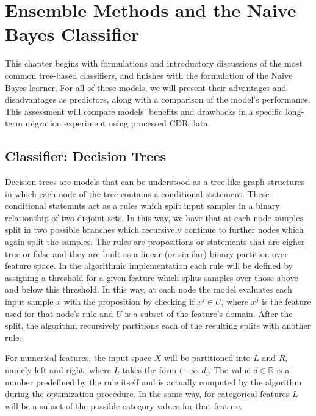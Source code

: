 \chapter{Ensemble Methods and the Naive Bayes Classifier}\label{ch:ensembleMethods}

This chapter begins with formulations and introductory discussions of the most common tree-based classifiers, and finishes with the formulation of the Naive Bayes learner.
For all of these models, we will present their advantages and disadvantages as predictors, along with a comparison of the model's performance.
This assessment will compare models' benefits and drawbacks in a specific long-term migration experiment using processed CDR data.

\section{Classifier: Decision Trees}\label{section:decision_trees}


Decision trees are models that can be understood as a tree-like graph structures in which each node of the tree contains a conditional statement.
These conditional statemnts act as a rules which split input samples in a binary relationship of two disjoint sets.
In this way, we have that at each node samples split in two possible branches which recursively continue to further nodes which again split the samples.
The rules are propositions or statements that are eigher true or false and they are built as a linear (or similar) binary partition over feature space.
In the algorithmic implementation each rule will be defined by assigning a threshold for a given feature which splits samples over those above and below this threshold.
In this way, at each node the model evaluates each input sample $x$ with the proposition by checking if $x^j \in U$, where $x^j$ is the feature used for that node's rule and $U$ is a subset of the feature's domain.
After the split, the algorithm recursively partitions each of the resulting splits with another rule.


For numerical features, the input space $X$ will be partitioned into $L$ and $R$, namely left and right, where $L$ takes the form $(-\infty,d]$. The value $d \in \mathbb{R}$ is a number predefined by the rule itself and is actually computed by the algorithm during the optimization procedure.
In the same way, for categorical features $L$ will be a subset of the possible category values for that feature.

